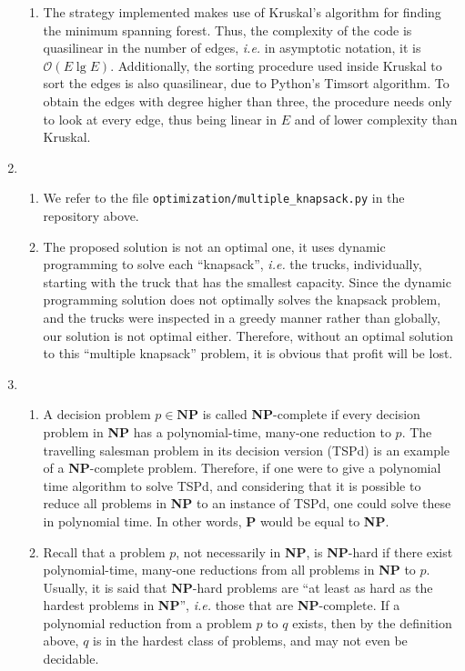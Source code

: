 \documentclass[12pt]{article}
\begin{document}
\begin{enumerate}
\begin{enumerate}
    \item The strategy implemented makes use of Kruskal's algorithm for finding the minimum spanning forest. Thus, the complexity of the code is quasilinear in the number of edges, \emph{i.e.} in asymptotic notation, it is $\mathcal{O}(E \lg E)$. Additionally, the sorting procedure used inside Kruskal to sort the edges is also quasilinear, due to Python's Timsort algorithm. To obtain the edges with degree higher than three, the procedure needs only to look at every edge, thus being linear in $E$ and of lower complexity than Kruskal.
  \end{enumerate}
  \item
  \begin{enumerate}
    \item We refer to the file \texttt{optimization/multiple\_knapsack.py} in the repository above.
    \item The proposed solution is not an optimal one, it uses dynamic programming to solve each ``knapsack'', \textit{i.e.} the trucks, individually, starting with the truck that has the smallest capacity. Since the dynamic programming solution does not optimally solves the knapsack problem, and the trucks were inspected in a greedy manner rather than globally, our solution is not optimal either. Therefore, without an optimal solution to this ``multiple knapsack'' problem, it is obvious that profit will be lost.
  \end{enumerate}
  \item 
  \begin{enumerate}
    \item A decision problem $p \in \mathbf{NP}$ is called \textbf{NP}-complete if every decision problem in \textbf{NP} has a polynomial-time, many-one reduction to $p$. The travelling salesman problem in its decision version (TSPd) is an example of a \textbf{NP}-complete problem. Therefore, if one were to give a polynomial time algorithm to solve TSPd, and considering that it is possible to reduce all problems in \textbf{NP} to an instance of TSPd, one could solve these in polynomial time. In other words, \textbf{P} would be equal to \textbf{NP}.
    \item Recall that a problem $p$, not necessarily in \textbf{NP}, is \textbf{NP}-hard if there exist polynomial-time, many-one reductions from all problems in \textbf{NP} to $p$. Usually, it is said that \textbf{NP}-hard problems are ``at least as hard as the hardest problems in \textbf{NP}'', \emph{i.e.} those that are \textbf{NP}-complete. If a polynomial reduction from a problem $p$ to $q  $ exists, then by the definition above, $q$ is in the hardest class of problems, and may not even be decidable.

\end{enumerate}
\end{enumerate}
\end{document}
